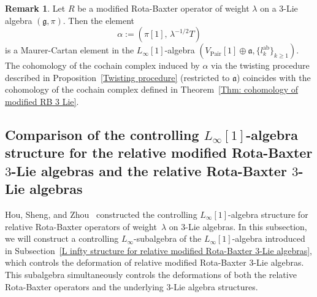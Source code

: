 \documentclass[12pt]{amsart}
\theoremstyle{definition}
\newtheorem{remark}[theorem]{Remark}
\begin{document}
\begin{remark}
Let \( R \) be a modified Rota-Baxter operator of weight \( \lambda \) on a $3$-Lie algebra \( (\mathfrak{g}, \pi) \). Then the element
\[
\alpha := (\pi[1],\, \lambda^{-1/2} T)
\]
is a Maurer-Cartan element in the \( L_\infty[1] \)-algebra \( (V_{\mathrm{Pair}}[1] \oplus \mathfrak{a}, \{l^{\mathrm{ab}}_k\}_{k \geq 1}) \). The cohomology of the cochain complex induced by \( \alpha \) via the twisting procedure described in Proposition~\ref{Twisting procedure} (restricted to \( \mathfrak{a} \)) coincides with the cohomology of the cochain complex defined in Theorem~\ref{Thm: cohomology of modified RB 3 Lie}.

	
\end{remark}


\subsection{Comparison of the controlling $L_\infty[1]$-algebra structure for the  relative modified Rota-Baxter $3$-Lie algebras  and the relative Rota-Baxter $3$-Lie algebras}

Hou, Sheng, and Zhou~\cite{HSZ23} constructed the controlling $L_\infty[1]$-algebra structure for relative Rota-Baxter operators of weight~$\lambda$ on $3$-Lie algebras. In this subsection, we will construct a controlling $L_\infty$-subalgebra of the $L_\infty[1]$-algebra introduced in Subsection~\ref{L infty structure for relative modified Rota-Baxter 3-Lie algebras}, which controls the deformation  of relative modified Rota-Baxter $3$-Lie algebras. This subalgebra simultaneously controls the deformations of both the relative Rota-Baxter operators and the underlying $3$-Lie algebra structures.
\end{document}
